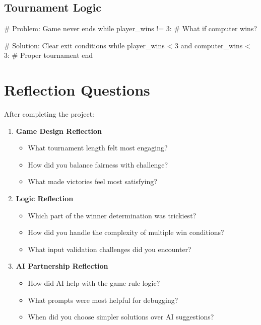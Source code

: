 \documentclass[
  letterpaper,
  DIV=11,
  numbers=noendperiod,
  oneside]{scrreprt}
\newenvironment{Shaded}{}{}
\newcommand{\CommentTok}[1]{\textcolor[rgb]{0.42,0.45,0.49}{#1}}
\newcommand{\ControlFlowTok}[1]{\textcolor[rgb]{0.84,0.23,0.29}{#1}}
\newcommand{\DecValTok}[1]{\textcolor[rgb]{0.00,0.36,0.77}{#1}}
\newcommand{\KeywordTok}[1]{\textcolor[rgb]{0.84,0.23,0.29}{#1}}
\newcommand{\NormalTok}[1]{\textcolor[rgb]{0.14,0.16,0.18}{#1}}
\newcommand{\OperatorTok}[1]{\textcolor[rgb]{0.14,0.16,0.18}{#1}}
\providecommand{\tightlist}{%
  \setlength{\itemsep}{0pt}\setlength{\parskip}{0pt}}\usepackage{longtable,booktabs,array}
\begin{document}
\subsection{Tournament Logic}\label{tournament-logic}

\begin{Shaded}
\begin{Highlighting}[]
\CommentTok{\# Problem: Game never ends}
\ControlFlowTok{while}\NormalTok{ player\_wins }\OperatorTok{!=} \DecValTok{3}\NormalTok{:  }\CommentTok{\# What if computer wins?}

\CommentTok{\# Solution: Clear exit conditions}
\ControlFlowTok{while}\NormalTok{ player\_wins }\OperatorTok{\textless{}} \DecValTok{3} \KeywordTok{and}\NormalTok{ computer\_wins }\OperatorTok{\textless{}} \DecValTok{3}\NormalTok{:  }\CommentTok{\# Proper tournament end}
\end{Highlighting}
\end{Shaded}

\section{Reflection Questions}\label{reflection-questions-3}

After completing the project:

\begin{enumerate}
\def\labelenumi{\arabic{enumi}.}
\tightlist
\item
  \textbf{Game Design Reflection}

  \begin{itemize}
  \tightlist
  \item
    What tournament length felt most engaging?
  \item
    How did you balance fairness with challenge?
  \item
    What made victories feel most satisfying?
  \end{itemize}
\item
  \textbf{Logic Reflection}

  \begin{itemize}
  \tightlist
  \item
    Which part of the winner determination was trickiest?
  \item
    How did you handle the complexity of multiple win conditions?
  \item
    What input validation challenges did you encounter?
  \end{itemize}
\item
  \textbf{AI Partnership Reflection}

  \begin{itemize}
  \tightlist
  \item
    How did AI help with the game rule logic?
  \item
    What prompts were most helpful for debugging?
  \item
    When did you choose simpler solutions over AI suggestions?
  \end{itemize}
\end{enumerate}
\end{document}
